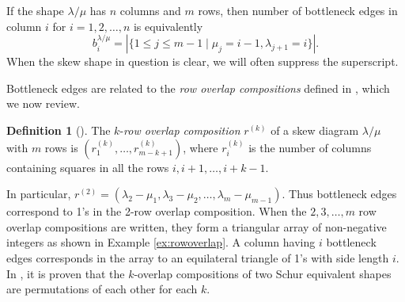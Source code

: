\documentclass[12pt]{amsart}
\theoremstyle{definition}
\newtheorem{defn}[thm]{Definition}
\begin{document}
If the shape $\lambda/\mu$ has $n$ columns and $m$ rows, then number of bottleneck edges in column $i$ for $i = 1,2, \ldots , n$ is equivalently
\[
 b_i^{\lambda / \mu} = | \lbrace 1\leq{j}\leq{m-1} \mid \mu_j = i-1, \lambda_{j+1}=i \rbrace |.
\]
When the skew shape in question is clear, we will often suppress the superscript. 


Bottleneck edges are related to the \textit{row overlap compositions} defined in \cite{rsw2009coincidences}, which we now review.

\begin{defn}[\cite{rsw2009coincidences}]
The $k$-\textit{row overlap composition} $r^{(k)}$ of a skew diagram $\lambda/\mu$ with $m$ rows is $(r^{(k)}_1,\ldots,r^{(k)}_{m-k+1})$, where $r^{(k)}_i$ is the number of columns containing squares in all the rows $i,i+1,\ldots,i+k-1$. 
\end{defn}

In particular, $r^{(2)} = (\lambda_2-\mu_1,\lambda_{3}-\mu_2,\ldots,\lambda_m - \mu_{m-1})$. Thus bottleneck edges correspond to 1's in the 2-row overlap composition. When the $2, 3, \ldots, m$ row overlap compositions are written, they form a triangular array of non-negative integers as shown in Example \ref{ex:rowoverlap}. A column having $i$ bottleneck edges corresponds in the array to an equilateral triangle of 1's with side length $i$. In \cite{rsw2009coincidences}, it is proven that the $k$-overlap compositions of two Schur equivalent shapes are permutations of each other for each $k$.
\end{document}
